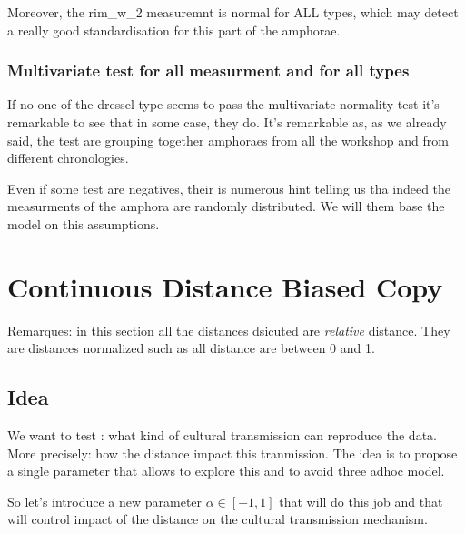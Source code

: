 \documentclass{article}
\begin{document}
Moreover, the rim\_w\_2  measuremnt is normal for ALL types, which may detect a really good standardisation for this part of the amphorae.  

\subsubsection{Multivariate test for all measurment and for all types}
If no one of the dressel type seems to pass the multivariate normality test it's remarkable to see that in some case, they do. It's remarkable as, as we already said, the test are grouping together amphoraes from all the workshop and from different chronologies.


Even if some test are negatives, their is numerous hint telling us tha indeed the measurments of the amphora are randomly distributed. We will them base the model on this assumptions.

\section{Continuous Distance Biased Copy}
Remarques: in this section all the distances dsicuted are \emph{relative} distance. They are distances normalized such as all distance are between 0 and 1.

\subsection{Idea}
  We want to test : what kind of cultural transmission can reproduce the data. More precisely: how the distance impact this tranmission.
The idea is to propose a single parameter that allows to explore this  and to avoid three adhoc model.

So let's introduce a new parameter $\alpha \in [-1,1]$ that will do this job and that will control impact of the distance on the cultural transmission mechanism. 
\end{document}
